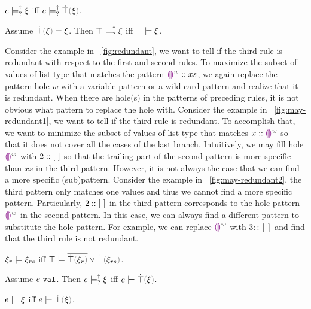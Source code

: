 \begin{lemma}
  $e \models_{?}^{\dag} \xi$ iff $\csatisfyormay{e}{\ctruify{\xi}}$.
\end{lemma}

\begin{lemma}
  Assume $\ctruify{\xi}=\xi$. Then $\top \models_{?}^{\dag} \xi$ iff $\top \models \xi$.
\end{lemma}

Consider the example in \figurename~\ref{fig:redundant}, we want to tell if the third rule is redundant with respect to the first and second rules. To maximize the subset of values of list type that matches the pattern $\textcolor{violet}{\llparenthesis}\textcolor{violet}{\rrparenthesis}^{w}::xs$, we again replace the pattern hole $w$ with a variable pattern or a wild card pattern and realize that it is redundant. When there are hole(s) in the patterns of preceding rules, it is not obvious what pattern to replace the hole with. Consider the example in \figurename~\ref{fig:may-redundant1}, we want to tell if the third rule is redundant. To accomplish that, we want to minimize the subset of values of list type that matches $x::\textcolor{violet}{\llparenthesis}\textcolor{violet}{\rrparenthesis}^{w}$ so that it does not cover all the cases of the last branch. Intuitively, we may fill hole $\textcolor{violet}{\llparenthesis}\textcolor{violet}{\rrparenthesis}^{w}$ with $2::[~]$ so that the trailing part of the second pattern is more specific than $xs$ in the third pattern. However, it is not always the case that we can find a more specific (sub)pattern. Consider the example in \figurename~\ref{fig:may-redundant2}, the third pattern only matches one values and thus we cannot find a more specific pattern. Particularly, $2::[~]$ in the third pattern corresponds to the hole pattern $\textcolor{violet}{\llparenthesis}\textcolor{violet}{\rrparenthesis}^{w}$ in the second pattern. In this case, we can always find a different pattern to substitute the hole pattern. For example, we can replace $\textcolor{violet}{\llparenthesis}\textcolor{violet}{\rrparenthesis}^{w}$ with $3::[]$ and find that the third rule is not redundant.
\begin{theorem}
\label{theorem:redundant-truify-falsify}
  $\xi_r \models \xi_{rs}$ iff $\csatisfy{\ctruth}{\cor{\cdual{\ctruify{\xi_r}}}{\cfalsify{\xi_{rs}}}}$.
\end{theorem}

\begin{lemma}
  Assume $e ~\mathtt{val}$. Then $e \models_{?}^{\dag} \xi$ iff $\csatisfy{e}{\ctruify{\xi}}$.
\end{lemma}

\begin{lemma}
  $e \models \xi$ iff $\csatisfy{e}{\cfalsify{\xi}}$.
\end{lemma}


